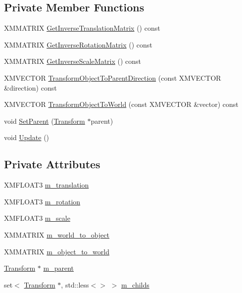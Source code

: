 \subsection*{Private Member Functions}
\begin{DoxyCompactItemize}
\item 
X\+M\+M\+A\+T\+R\+IX \hyperlink{structmage_1_1_transform_a4cd7f7143c49772a83adfbd1d75dd475}{Get\+Inverse\+Translation\+Matrix} () const
\item 
X\+M\+M\+A\+T\+R\+IX \hyperlink{structmage_1_1_transform_a12e7ee212a9270fb3f01de9b7f5ee3b8}{Get\+Inverse\+Rotation\+Matrix} () const
\item 
X\+M\+M\+A\+T\+R\+IX \hyperlink{structmage_1_1_transform_a31da6a53e73a6254bc36cd0348c65cda}{Get\+Inverse\+Scale\+Matrix} () const
\item 
X\+M\+V\+E\+C\+T\+OR \hyperlink{structmage_1_1_transform_acc7a0f4ce2d6585fb19c1a6272cc84d2}{Transform\+Object\+To\+Parent\+Direction} (const X\+M\+V\+E\+C\+T\+OR \&direction) const
\item 
X\+M\+V\+E\+C\+T\+OR \hyperlink{structmage_1_1_transform_a3e5b476d0078f6bf243a7effa0f781fc}{Transform\+Object\+To\+World} (const X\+M\+V\+E\+C\+T\+OR \&vector) const
\item 
void \hyperlink{structmage_1_1_transform_af7eeba5fe16b705b14b85017a5ac0569}{Set\+Parent} (\hyperlink{structmage_1_1_transform}{Transform} $\ast$parent)
\item 
void \hyperlink{structmage_1_1_transform_ab80fc4a9bd034540b1d30242c4d9ca90}{Update} ()
\end{DoxyCompactItemize}
\subsection*{Private Attributes}
\begin{DoxyCompactItemize}
\item 
X\+M\+F\+L\+O\+A\+T3 \hyperlink{structmage_1_1_transform_a57e27b28e0cf85be034055a68513ad79}{m\+\_\+translation}
\item 
X\+M\+F\+L\+O\+A\+T3 \hyperlink{structmage_1_1_transform_a037b4fb338bfe79aa2ab1a2e809c40df}{m\+\_\+rotation}
\item 
X\+M\+F\+L\+O\+A\+T3 \hyperlink{structmage_1_1_transform_a25d15c85b93037bab5b755c86bef0b54}{m\+\_\+scale}
\item 
X\+M\+M\+A\+T\+R\+IX \hyperlink{structmage_1_1_transform_a873fefd93a3c1ca938e2bbecdbc5b3ac}{m\+\_\+world\+\_\+to\+\_\+object}
\item 
X\+M\+M\+A\+T\+R\+IX \hyperlink{structmage_1_1_transform_a4e227321c984ddf2ece92d7954ae5db9}{m\+\_\+object\+\_\+to\+\_\+world}
\item 
\hyperlink{structmage_1_1_transform}{Transform} $\ast$ \hyperlink{structmage_1_1_transform_a5ddf9b608e25dc0dbe82016d926e29b5}{m\+\_\+parent}
\item 
set$<$ \hyperlink{structmage_1_1_transform}{Transform} $\ast$, std\+::less$<$$>$ $>$ \hyperlink{structmage_1_1_transform_ae5636bac77531caccf97a79cb22b6915}{m\+\_\+childs}
\end{DoxyCompactItemize}


